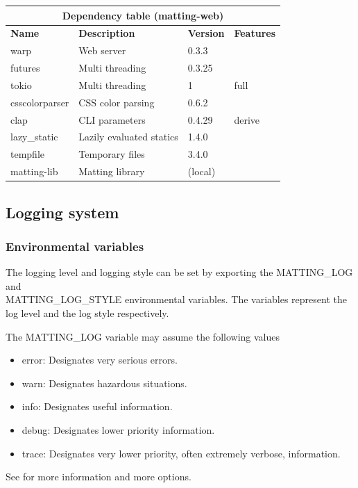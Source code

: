 \documentclass[a4paper]{article}
\begin{document}
\bgroup{}
\def\arraystretch{1.5}
\begin{center}
    \begin{tabular}{ |p{2cm}|p{4cm}|p{1.5cm}|p{2cm}| }
        \hline
        \multicolumn{4}{|c|}{\textbf{Dependency table (matting-web)}} \\
        \hline
        \textbf{Name} & \textbf{Description} & \textbf{Version} & \textbf{Features} \\
        \hline
        warp & Web server & 0.3.3 & \- \\
        \hline
        futures & Multi threading & 0.3.25 & \- \\
        \hline
        tokio & Multi threading & 1 & full \\
        \hline
        csscolorparser & CSS color parsing & 0.6.2 & \- \\
        \hline
        clap & CLI parameters & 0.4.29 & derive \\
        \hline
        lazy\_static & Lazily evaluated statics & 1.4.0 & \- \\
        \hline
        tempfile & Temporary files & 3.4.0 & \- \\
        \hline
        matting-lib & Matting library & (local) & \- \\
        \hline
    \end{tabular}
\end{center}
\egroup{}

\pagebreak

\subsection{Logging system}

\subsubsection{Environmental variables}

The logging level and logging style can be set
by exporting the \colorbox{gray!10}{MATTING\_LOG} and \\
\colorbox{gray!10}{MATTING\_LOG\_STYLE}
environmental variables. The variables represent the log level
and the log style respectively.

The \colorbox{gray!10}{MATTING\_LOG} variable may assume the following values
\begin{itemize}
    \item \colorbox{gray!10}{error}: Designates very serious errors.
    \item \colorbox{gray!10}{warn}: Designates hazardous situations.
    \item \colorbox{gray!10}{info}: Designates useful information.
    \item \colorbox{gray!10}{debug}: Designates lower priority information.
    \item \colorbox{gray!10}{trace}: Designates very lower priority, often extremely verbose, information.
\end{itemize}
See \cite{envlogginglvl} for more information and more options.
\end{document}

